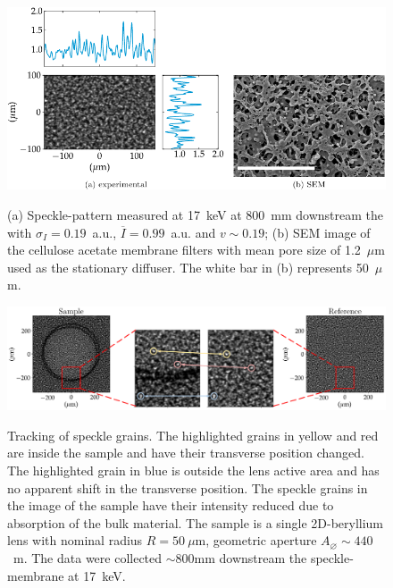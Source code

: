 \begin{refsection}
\begin{figure}[t]
        \centering
        {\includegraphics[width=0.7\linewidth]{figures/ch04/SpecklePattern.pdf}}
        \caption[Speckle-pattern and the stationary diffuser]{(a) Speckle-pattern measured at 17~keV at 800~mm downstream the with $\sigma_I=0.19$~a.u., $\overline{I}=0.99$~a.u. and $v\sim0.19$; (b) SEM image of the cellulose acetate membrane filters with mean pore size of 1.2~$\mu$m used as the stationary diffuser. The white bar in (b) represents 50~$\mu$m.} \label{fig:SpecklePattern}
\end{figure}

\begin{figure}[t]
        \centering
        {\includegraphics[width=1\linewidth]{figures/ch04/speckle_tracking.pdf}}
        \caption[Tracking of speckle grain]{Tracking of speckle grains. The highlighted grains in yellow and red are inside the sample and have their transverse position changed. The highlighted grain in blue is outside the lens active area and has no apparent shift in the transverse position. The speckle grains in the image of the sample have their intensity reduced due to absorption of the bulk material. The sample is a single 2D-beryllium lens with nominal radius $R=50~\mu\text{m}$, geometric aperture $A_{\diameter}\sim440$~\textmu m. The data were collected $\sim$800mm downstream the speckle-membrane at 17~keV.} \label{fig:speckle_tracking}
\end{figure}


\end{refsection}
